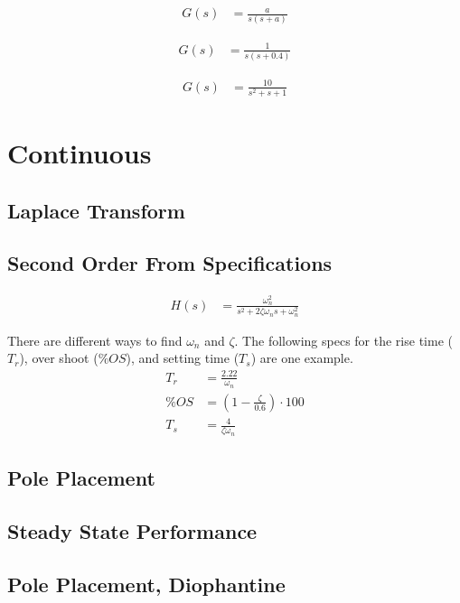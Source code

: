 \documentclass{article}
\newcommand{\sincludepdf}[2][]{
	
}
\begin{document}
\begin{align*}
	G(s) &= \frac{a}{s(s + a)}
\end{align*}

\begin{align*}
	G(s) &= \frac{1}{s(s + 0.4)}
\end{align*}

\begin{align*}
	G(s) &= \frac{10}{s^2 + s + 1}
\end{align*}


\clearpage
\section{Continuous}

\subsection{Laplace Transform}

\sincludepdf[pages={1}]{scan/11211301.pdf}

\subsection{Second Order From Specifications}

\begin{align}
	H(s) &= \frac{\omega_n^2}{s^2 + 2 \zeta \omega_n s + \omega_n^2}
\end{align}

There are different ways to find $\omega_n$ and $\zeta$.
The following specs for the rise time ($T_r$), over shoot ($\%OS$),
and setting time ($T_s$) are one example.
\begin{align*}
	T_r &= \frac{2.22}{\omega_n} \\
	\%OS &= \left( 1 - \frac{\zeta}{0.6} \right) \cdot 100 \\
	T_s &= \frac{4}{\zeta \omega_n}
\end{align*}

\subsection{Pole Placement}

\subsection{Steady State Performance}

\subsection{Pole Placement, Diophantine}
\end{document}
